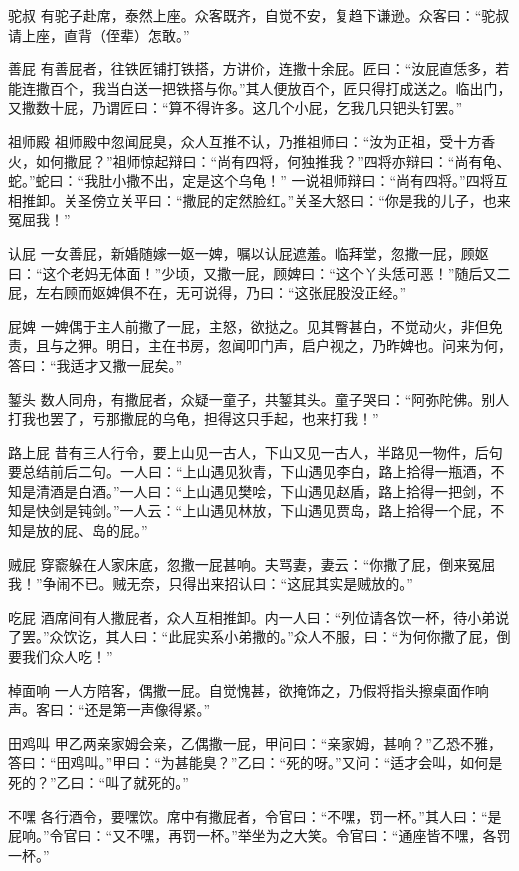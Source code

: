 \documentclass[12pt,UTF8]{ctexbook}
\begin{document}
驼叔
有驼子赴席，泰然上座。众客既齐，自觉不安，复趋下谦逊。众客曰：“驼叔请上座，直背（侄辈）怎敢。”

善屁
有善屁者，往铁匠铺打铁搭，方讲价，连撒十余屁。匠曰：“汝屁直恁多，若能连撒百个，我当白送一把铁搭与你。”其人便放百个，匠只得打成送之。临出门，又撒数十屁，乃谓匠曰：“算不得许多。这几个小屁，乞我几只钯头钉罢。”

祖师殿
祖师殿中忽闻屁臭，众人互推不认，乃推祖师曰：“汝为正祖，受十方香火，如何撒屁？”祖师惊起辩曰：“尚有四将，何独推我？”四将亦辩曰：“尚有龟、蛇。”蛇曰：“我肚小撒不出，定是这个乌龟！”
一说祖师辩曰：“尚有四将。”四将互相推卸。关圣傍立关平曰：“撒屁的定然脸红。”关圣大怒曰：“你是我的儿子，也来冤屈我！”

认屁
一女善屁，新婚随嫁一妪一婢，嘱以认屁遮羞。临拜堂，忽撒一屁，顾妪曰：“这个老妈无体面！”少顷，又撒一屁，顾婢曰：“这个丫头恁可恶！”随后又二屁，左右顾而妪婢俱不在，无可说得，乃曰：“这张屁股没正经。”

屁婢
一婢偶于主人前撒了一屁，主怒，欲挞之。见其臀甚白，不觉动火，非但免责，且与之狎。明日，主在书房，忽闻叩门声，启户视之，乃昨婢也。问来为何，答曰：“我适才又撒一屁矣。”

錾头
数人同舟，有撒屁者，众疑一童子，共錾其头。童子哭曰：“阿弥陀佛。别人打我也罢了，亏那撒屁的乌龟，担得这只手起，也来打我！”

路上屁
昔有三人行令，要上山见一古人，下山又见一古人，半路见一物件，后句要总结前后二句。一人曰：“上山遇见狄青，下山遇见李白，路上拾得一瓶酒，不知是清酒是白酒。”一人曰：“上山遇见樊哙，下山遇见赵盾，路上拾得一把剑，不知是快剑是钝剑。”一人云：“上山遇见林放，下山遇见贾岛，路上拾得一个屁，不知是放的屁、岛的屁。”

贼屁
穿窬躲在人家床底，忽撒一屁甚响。夫骂妻，妻云：“你撒了屁，倒来冤屈我！”争闹不已。贼无奈，只得出来招认曰：“这屁其实是贼放的。”

吃屁
酒席间有人撒屁者，众人互相推卸。内一人曰：“列位请各饮一杯，待小弟说了罢。”众饮讫，其人曰：“此屁实系小弟撒的。”众人不服，曰：“为何你撒了屁，倒要我们众人吃！”

棹面响
一人方陪客，偶撒一屁。自觉愧甚，欲掩饰之，乃假将指头擦桌面作响声。客曰：“还是第一声像得紧。”

田鸡叫
甲乙两亲家姆会亲，乙偶撒一屁，甲问曰：“亲家姆，甚响？”乙恐不雅，答曰：“田鸡叫。”甲曰：“为甚能臭？”乙曰：“死的呀。”又问：“适才会叫，如何是死的？”乙曰：“叫了就死的。”

不嘿
各行酒令，要嘿饮。席中有撒屁者，令官曰：“不嘿，罚一杯。”其人曰：“是屁响。”令官曰：“又不嘿，再罚一杯。”举坐为之大笑。令官曰：“通座皆不嘿，各罚一杯。”
\end{document}
